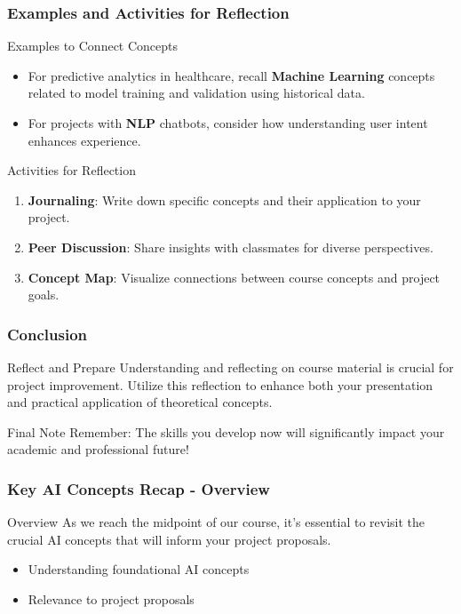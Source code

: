 \documentclass[aspectratio=169]{beamer}
\begin{document}
\begin{frame}[fragile]
    \frametitle{Examples and Activities for Reflection}
    \begin{block}{Examples to Connect Concepts}
        \begin{itemize}
            \item For predictive analytics in healthcare, recall \textbf{Machine Learning} concepts related to model training and validation using historical data.
            \item For projects with \textbf{NLP} chatbots, consider how understanding user intent enhances experience.
        \end{itemize}
    \end{block}
    
    \begin{block}{Activities for Reflection}
        \begin{enumerate}
            \item \textbf{Journaling}: Write down specific concepts and their application to your project.
            \item \textbf{Peer Discussion}: Share insights with classmates for diverse perspectives.
            \item \textbf{Concept Map}: Visualize connections between course concepts and project goals.
        \end{enumerate}
    \end{block}
\end{frame}

\begin{frame}[fragile]
    \frametitle{Conclusion}
    \begin{block}{Reflect and Prepare}
        Understanding and reflecting on course material is crucial for project improvement. Utilize this reflection to enhance both your presentation and practical application of theoretical concepts.
    \end{block}
    
    \begin{block}{Final Note}
        Remember: The skills you develop now will significantly impact your academic and professional future!
    \end{block}
\end{frame}

\begin{frame}[fragile]
    \frametitle{Key AI Concepts Recap - Overview}
    \begin{block}{Overview}
        As we reach the midpoint of our course, it's essential to revisit the crucial AI concepts that will inform your project proposals.
    \end{block}
    \begin{itemize}
        \item Understanding foundational AI concepts
        \item Relevance to project proposals
    \end{itemize}
\end{frame}
\end{document}
